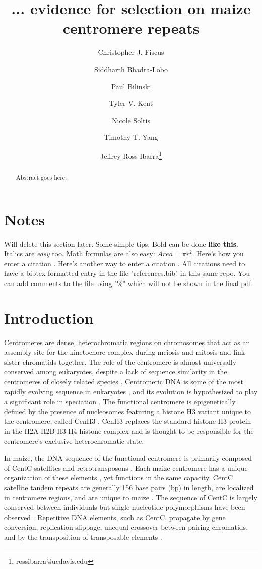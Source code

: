 \documentclass[12pt]{article}
\title{... evidence for selection on maize centromere repeats}
\author[1]{Christopher J. Fiscus}
\author[1]{Siddharth Bhadra-Lobo}
\author[1]{Paul Bilinski}
\author[1]{Tyler V. Kent}
\author[1]{Nicole Soltis}
\author[1]{Timothy T. Yang}
\author[1,2]{Jeffrey Ross-Ibarra\thanks{rossibarra@ucdavis.edu}}
\affil[1]{Department of Plant Sciences, University of California Davis}
\affil[2]{Center for Population Biology and Genome Center, University of California Davis}
\date{}
\begin{document}
\maketitle

\begin{abstract}
Abstract goes here.
\end{abstract}

\begin{footnotesize}
\end{footnotesize}

\section*{Notes}

Will delete this section later.  Some simple tips:
Bold can be done {\bf like this}.  Italics are \emph{easy} too.  Math formulas are also easy: $Area=\pi r^2$.
Here's how you enter a citation \cite{Wolfgruber2009}.
Here's another way to enter a citation \citep{Wolfgruber2009}.
All citations need to have a bibtex formatted entry in the file "references.bib" in this same repo. You can add comments to the file using "\%" which will not be shown in the final pdf.  

\section{Introduction}

Centromeres are dense, heterochromatic regions on chromosomes that act as an assembly site for the kinetochore complex during meiosis and mitosis and link sister chromatids together.  The role of the centromere is almost universally conserved among eukaryotes, despite a lack of sequence similarity in the centromeres of closely related species \cite{Henikoff2001}.  Centromeric DNA is some of the most rapidly evolving sequence in eukaryotes \cite{Csink1998}, \cite{Henikoff2001} and its evolution is hypothesized to play a significant role in speciation \cite{Henikoff2001}.  The functional centromere is epigenetically defined by the presence of nucleosomes featuring a histone H3 variant unique to the centromere, called CenH3 \cite{Henikoff2001}.  CenH3 replaces the standard histone H3 protein in the H2A-H2B-H3-H4 histone complex and is thought to be responsible for the centromere's exclusive heterochromatic state. %

In maize, the DNA sequence of the functional centromere is primarily composed of CentC satellites and retrotransposons \cite{Nagaki2003}.  Each maize centromere has a unique organization of these elements \cite{Ananiev1998}, yet functions in the same capacity.  CentC satellite tandem repeats are generally 156 base pairs (bp) in length, are localized in centromere regions, and are unique to maize \cite{Ananiev1998}.  The sequence of CentC is largely conserved between individuals but single nucleotide polymorphisms have been observed \cite{Ananiev1998}.  Repetitive DNA elements, such as CentC, propagate by gene conversion, replication slippage, unequal crossover between pairing chromatids, and by the transposition of transposable elements \cite{Copenhaver2004}.   
\end{document}
